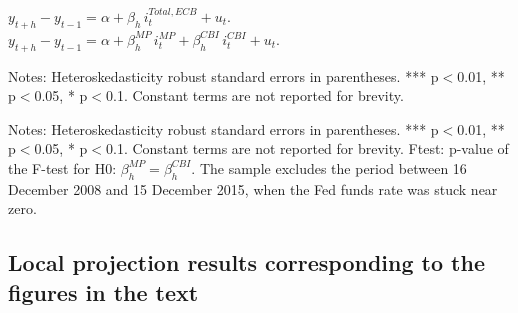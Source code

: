 \documentclass[a4paper,12pt]{article}
\newcommand{\pathTables}{tables/}
\begin{document}
\begin{table}[!htbp]
\begin{center}
\caption{The effect of ECB interest rate surprises and shocks on financial variables}\label{tab: reg ecb surp}
$y^{}_{t+h}-y^{}_{t-1} = \alpha + \beta_h\, i^{Total,ECB}_t + u_t.$\\
$y^{}_{t+h}-y^{}_{t-1} = \alpha + \beta^{MP}_h\, i^{MP}_t + \beta^{CBI}_h\, i^{CBI}_t + u_t.$
\small
{}
\end{center}\footnotesize
Notes: Heteroskedasticity robust standard errors in parentheses. *** p$<$0.01, ** p$<$0.05, * p$<$0.1.
Constant terms are not reported for brevity.
\end{table}



\begin{table}[!htbp]\small
\begin{center}
\caption{The effect of ECB monetary policy and information shocks on Fed funds futures, omitting the Zero Lower Bound period.}\label{tab: lp ecb shocks fff nozlb}
\end{center}
Notes: Heteroskedasticity robust standard errors in parentheses. *** p$<$0.01, ** p$<$0.05, * p$<$0.1.
Constant terms are not reported for brevity.
Ftest: p-value of the F-test for H0: $\beta^{MP}_h=\beta^{CBI}_h$.
The sample excludes the period between 16 December 2008 and 15 December 2015, when the Fed funds rate was stuck near zero.
\end{table}

\clearpage

\subsection{Local projection results corresponding to the figures in the text}
\end{document}
